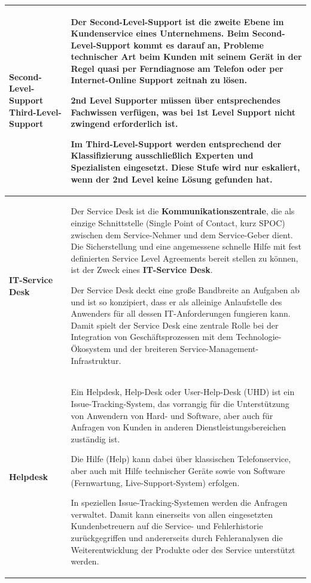 \documentclass[10pt]{article}
\begin{document}
\begin{flushleft}
\begin{longtable}{|p{}|p{}|}
        \textbf{Second-Level-Support}
        \textbf{Third-Level-Support}
        &
        Der Second-Level-Support ist die zweite Ebene im Kundenservice eines Unternehmens. Beim Second-Level-Support kommt es darauf an, Probleme technischer Art beim Kunden mit seinem Gerät in der Regel quasi per Ferndiagnose am Telefon oder per Internet-Online Support zeitnah zu lösen.
        
        2nd Level Supporter müssen über entsprechendes Fachwissen verfügen, was bei 1st Level Support nicht zwingend erforderlich ist.
        
        Im Third-Level-Support werden entsprechend der Klassifizierung ausschließlich Experten und Spezialisten eingesetzt. Diese Stufe wird nur eskaliert, wenn der 2nd Level keine Lösung gefunden hat.
        \\\hline
        
        \textbf{IT-Service Desk}&
        Der Service Desk ist die \textbf{Kommunikationszentrale}, die als einzige Schnittstelle (Single Point of Contact, kurz SPOC) zwischen dem Service-Nehmer und dem Service-Geber dient. Die Sicherstellung und eine angemessene schnelle Hilfe mit fest definierten Service Level Agreements bereit stellen zu können, ist der Zweck eines \textbf{IT-Service Desk}.
        
        Der Service Desk deckt eine große Bandbreite an Aufgaben ab und ist so konzipiert, dass er als alleinige Anlaufstelle des Anwenders für all dessen IT-Anforderungen fungieren kann. Damit spielt der Service Desk eine zentrale Rolle bei der Integration von Geschäftsprozessen mit dem Technologie-Ökosystem und der breiteren Service-Management-Infrastruktur. 
        \\\hline

        \textbf{Helpdesk}&
        Ein Helpdesk, Help-Desk oder User-Help-Desk (UHD) ist ein Issue-Tracking-System, das vorrangig für die Unterstützung von Anwendern von Hard- und Software, aber auch für Anfragen von Kunden in anderen Dienstleistungsbereichen zuständig ist.
        
        Die Hilfe (Help) kann dabei über klassischen Telefonservice, aber auch mit Hilfe technischer Geräte sowie von Software (Fernwartung, Live-Support-System) erfolgen.
        
        In speziellen Issue-Tracking-Systemen werden die Anfragen verwaltet. Damit kann einerseits von allen eingesetzten Kundenbetreuern auf die Service- und Fehlerhistorie zurückgegriffen und andererseits durch Fehleranalysen die Weiterentwicklung der Produkte oder des Service unterstützt werden.
        \\\hline


\end{longtable}
\end{flushleft}
\end{document}
